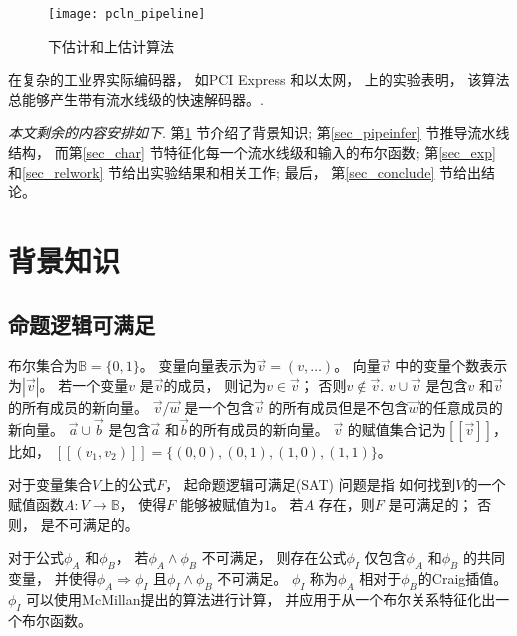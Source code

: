 \begin{figure}[t]
\begin{center}
\texttt{[image: pcln\_pipeline]}
\end{center}
\caption{下估计和上估计算法}
  \label{fig_pc}
\end{figure}

在复杂的工业界实际编码器，
如PCI Express \cite{pcie21} 和以太网\cite{IEEE8023_S4}，
上的实验表明，
该算法总能够产生带有流水线级的快速解码器。.


\emph{本文剩余的内容安排如下}.
第\ref{sec_prem} 节介绍了背景知识;
第\ref{sec_pipeinfer} 节推导流水线结构，
而第\ref{sec_char} 节特征化每一个流水线级和输入的布尔函数;
第\ref{sec_exp} 和\ref{sec_relwork} 节给出实验结果和相关工作;
最后，
第\ref{sec_conclude} 节给出结论。



\section{背景知识}\label{sec_prem}




\subsection{命题逻辑可满足}\label{subsec_SAT}
布尔集合为$\mathbb{B}=\{0,1\}$。
变量向量表示为$\vec{v}=(v,\dots)$。
向量$\vec{v}$ 中的变量个数表示为$|\vec{v}|$。
若一个变量$v$ 是$\vec{v}$的成员，
则记为$v\in\vec{v}$；
否则$v\notin\vec{v}$.
$v\cup\vec{v}$ 是包含$v$ 和$\vec{v}$的所有成员的新向量。
$\vec{v}/\vec{w}$ 是一个包含$\vec{v}$ 的所有成员但是不包含$\vec{w}$的任意成员的新向量。
$\vec{a}\cup\vec{b}$ 是包含$\vec{a}$ 和$\vec{b}$的所有成员的新向量。
$\vec{v}$ 的赋值集合记为$[\![\vec{v}]\!]$，
比如，
$[\![(v_1,v_2)]\!]=\{(0,0),(0,1),(1,0),(1,1)\}$。


对于变量集合$V$上的公式$F$，
起命题逻辑可满足(SAT)  问题是指
如何找到$V$的一个赋值函数$A:V\to \mathbb{B}$，
使得$F$ 能够被赋值为$1$。
若$A$ 存在，则$F$ 是可满足的；
否则，
是不可满足的。

对于公式$\phi_A$ 和$\phi_B$，
若$\phi_A\wedge \phi_B$ 不可满足，
则存在公式$\phi_I$ 仅包含$\phi_A$ 和$\phi_B$ 的共同变量，
并使得$\phi_A\Rightarrow \phi_I$
且$\phi_I\wedge \phi_B$ 不可满足。
$\phi_I$ 称为$\phi_A$ 相对于$\phi_B$的Craig插值\cite{Craig}。
$\phi_I$ 可以使用McMillan提出的算法\cite{interp_McMillan}进行计算，
并应用于从一个布尔关系特征化出一个布尔函数\cite{InterpBoolFunction}。



